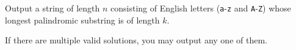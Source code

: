 
    Output a string of length $n$ consisting of English letters
    (\texttt{a}-\texttt{z} and \texttt{A}-\texttt{Z}) whose longest palindromic
    substring is of length $k$.

    If there are multiple valid solutions, you may output any one of them.
